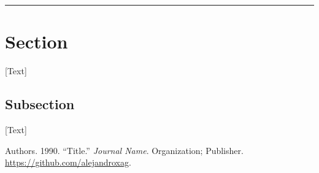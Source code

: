 \documentclass[
]{book}
\begin{document}
\begin{center}\rule{0.5\linewidth}{0.5pt}\end{center}

\hypertarget{section-1}{%
\section*{Section}\label{section-1}}

{[}Text{]}

\hypertarget{subsection-1}{%
\subsection*{Subsection}\label{subsection-1}}

{[}Text{]}

\hypertarget{refs}{}
\leavevmode\hypertarget{ref-firstreference}{}%
Authors. 1990. ``Title.'' \emph{Journal Name}. Organization; Publisher. \url{https://github.com/alejandroxag}.
\end{document}
